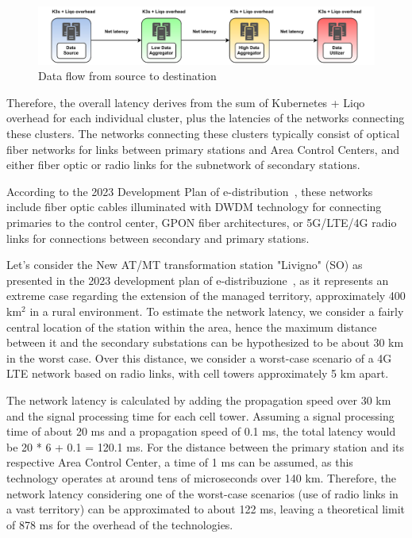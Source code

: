\begin{figure}[ht]\centering
\includegraphics[scale=0.9]{Pictures/latency-schema}
\caption{Data flow from source to destination}\label{fig:latency}
\end{figure}

Therefore, the overall latency derives from the sum of Kubernetes + Liqo overhead for each individual cluster, plus the latencies of the networks connecting these clusters. The networks connecting these clusters typically consist of optical fiber networks for links between primary stations and Area Control Centers, and either fiber optic or radio links for the subnetwork of secondary stations.

According to the 2023 Development Plan of e-distribution~\cite{e2-1}, these networks include fiber optic cables illuminated with DWDM technology for connecting primaries to the control center, GPON fiber architectures, or 5G/LTE/4G radio links for connections between secondary and primary stations.

Let's consider the New AT/MT transformation station "Livigno" (SO) as presented in the 2023 development plan of e-distribuzione~\cite{e2-2}, as it represents an extreme case regarding the extension of the managed territory, approximately 400 km$^2$ in a rural environment. To estimate the network latency, we consider a fairly central location of the station within the area, hence the maximum distance between it and the secondary substations can be hypothesized to be about 30 km in the worst case. Over this distance, we consider a worst-case scenario of a 4G LTE network based on radio links, with cell towers approximately 5 km apart.

The network latency is calculated by adding the propagation speed over 30 km and the signal processing time for each cell tower. Assuming a signal processing time of about 20 ms and a propagation speed of 0.1 ms, the total latency would be 20 * 6 + 0.1 = 120.1 ms. For the distance between the primary station and its respective Area Control Center, a time of 1 ms can be assumed, as this technology operates at around tens of microseconds over 140 km. Therefore, the network latency considering one of the worst-case scenarios (use of radio links in a vast territory) can be approximated to about 122 ms, leaving a theoretical limit of 878 ms for the overhead of the technologies.

